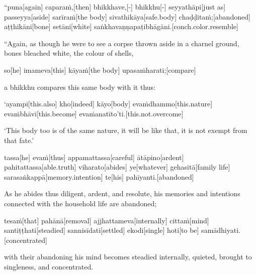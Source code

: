 \vskip 0.2in
\begin{samepage}
\begingl[glneveryline={\PaliGlossA,\PaliGlossB}]
“puna[again] caparaṁ,[then] bhikkhave,[-] bhikkhu[-] seyyathāpi[just as] passeyya[aside] sarīraṁ[the body] sivathikāya[safe.body] chaḍḍitaṁ;[abandoned] aṭṭhikāni[bone] setāni[white] saṅkhavaṇṇapaṭibhāgāni.[conch.color.resemble]
\endgl
\nopagebreak
\linespread{0.5}
\begin{spacin}{0.2}
{\PaliGlossFT “Again, as though he were to see a corpse thrown aside in a charnel ground, bones bleached white, the colour of shells,}
\end{spacin}
\vskip 12pt
\end{samepage}
\begin{samepage}
\begingl[glneveryline={\PaliGlossA,\PaliGlossB}]
so[he] imameva[this] kāyaṁ[the body] upasaṁharati;[compare]
\endgl
\nopagebreak
\linespread{0.5}
\begin{spacin}{0.2}
{\PaliGlossFT a bhikkhu compares this same body with it thus:}
\end{spacin}
\vskip 12pt
\end{samepage}
\begin{samepage}
\begingl[glneveryline={\PaliGlossA,\PaliGlossB}]
‘ayampi[this.also] kho[indeed] kāyo[body] evaṁdhammo[this.nature] evaṁbhāvī[this.become] evaṁanatīto’ti.[this.not.overcome]
\endgl
\nopagebreak
\linespread{0.5}
\begin{spacin}{0.2}
{\PaliGlossFT ‘This body too is of the same nature, it will be like that, it is not exempt from that fate.’}
\end{spacin}
\vskip 12pt
\end{samepage}
\begin{samepage}
\begingl[glneveryline={\PaliGlossA,\PaliGlossB}]
tassa[he] evaṁ[thus] appamattassa[careful] ātāpino[ardent] pahitattassa[able.truth] viharato[abides] ye[whatever] gehasitā[family life] sarasaṅkappā[memory.intention] te[his] pahīyanti.[abandoned]
\endgl
\nopagebreak
\linespread{0.5}
\begin{spacin}{0.2}
{\PaliGlossFT As he abides thus diligent, ardent, and resolute, his memories and intentions connected with the household life are abandoned;}
\end{spacin}
\vskip 12pt
\end{samepage}
\begin{samepage}
\begingl[glneveryline={\PaliGlossA,\PaliGlossB}]
tesaṁ[that] pahānā[removal] ajjhattameva[internally] cittaṁ[mind] santiṭṭhati[steadied] sannisīdati[settled] ekodi[single] hoti[to be] samādhiyati.[concentrated]
\endgl
\nopagebreak
\linespread{0.5}
\begin{spacin}{0.2}
{\PaliGlossFT with their abandoning his mind becomes steadied internally, quieted, brought to singleness, and concentrated.}
\end{spacin}
\vskip 12pt
\end{samepage}
